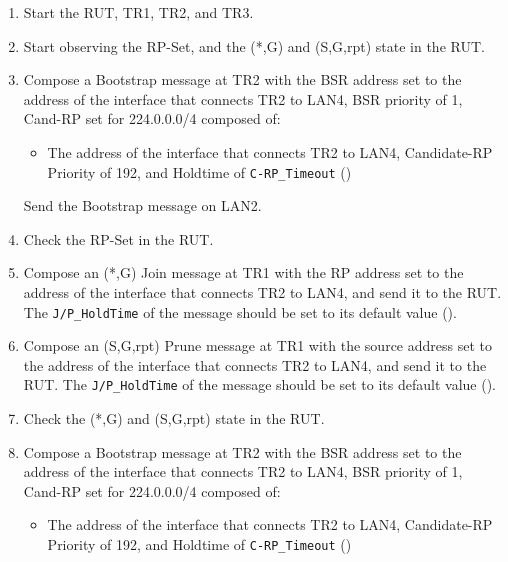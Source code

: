 \documentclass[11pt]{report}
\begin{document}
\begin{enumerate}

  \item Start the RUT, TR1, TR2, and TR3.

  \item Start observing the RP-Set, and the (*,G) and (S,G,rpt) state in the
  RUT.

  \item Compose a Bootstrap message at TR2 with
  the BSR address set to the address of the interface that connects TR2 to
  LAN4, BSR priority of 1, Cand-RP set for 224.0.0.0/4 composed of:

  \begin{itemize}

    \item The address of the interface that connects TR2 to LAN4,
    Candidate-RP Priority of 192, and Holdtime of \verb=C-RP_Timeout=
    ({\PimsmCRPTimeout})

  \end{itemize}

  Send the Bootstrap message on LAN2.

  \item Check the RP-Set in the RUT.

  \item Compose an (*,G) Join message at TR1 with the RP address set
  to the address of the interface that connects TR2 to LAN4, and send it to
  the RUT.
  The \verb=J/P_HoldTime= of the message should be set to its default
  value ({\PimsmJPHoldTime}).

  \item Compose an (S,G,rpt) Prune message at TR1 with the source address set
  to the address of the interface that connects TR2 to LAN4, and send it to
  the RUT.
  The \verb=J/P_HoldTime= of the message should be set to its default
  value ({\PimsmJPHoldTime}).

  \item Check the (*,G) and (S,G,rpt) state in the RUT.

  \item Compose a Bootstrap message at TR2 with
  the BSR address set to the address of the interface that connects TR2 to
  LAN4, BSR priority of 1, Cand-RP set for 224.0.0.0/4 composed of:

  \begin{itemize}

    \item The address of the interface that connects TR2 to LAN4,
    Candidate-RP Priority of 192, and Holdtime of \verb=C-RP_Timeout=
    ({\PimsmCRPTimeout})


\end{itemize}
\end{enumerate}
\end{document}
